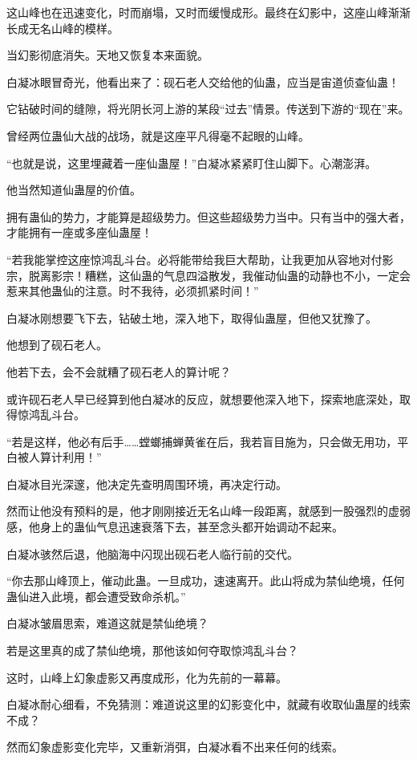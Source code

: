 \begin{this_body}
这山峰也在迅速变化，时而崩塌，又时而缓慢成形。最终在幻影中，这座山峰渐渐长成无名山峰的模样。

当幻影彻底消失。天地又恢复本来面貌。

白凝冰眼冒奇光，他看出来了：砚石老人交给他的仙蛊，应当是宙道侦查仙蛊！

它钻破时间的缝隙，将光阴长河上游的某段“过去”情景。传送到下游的“现在”来。

曾经两位蛊仙大战的战场，就是这座平凡得毫不起眼的山峰。

“也就是说，这里埋藏着一座仙蛊屋！”白凝冰紧紧盯住山脚下。心潮澎湃。

他当然知道仙蛊屋的价值。

拥有蛊仙的势力，才能算是超级势力。但这些超级势力当中。只有当中的强大者，才能拥有一座或多座仙蛊屋！

“若我能掌控这座惊鸿乱斗台。必将能带给我巨大帮助，让我更加从容地对付影宗，脱离影宗！糟糕，这仙蛊的气息四溢散发，我催动仙蛊的动静也不小，一定会惹来其他蛊仙的注意。时不我待，必须抓紧时间！”

白凝冰刚想要飞下去，钻破土地，深入地下，取得仙蛊屋，但他又犹豫了。

他想到了砚石老人。

他若下去，会不会就糟了砚石老人的算计呢？

或许砚石老人早已经算到他白凝冰的反应，就想要他深入地下，探索地底深处，取得惊鸿乱斗台。

“若是这样，他必有后手……螳螂捕蝉黄雀在后，我若盲目施为，只会做无用功，平白被人算计利用！”

白凝冰目光深邃，他决定先查明周围环境，再决定行动。

然而让他没有预料的是，他才刚刚接近无名山峰一段距离，就感到一股强烈的虚弱感，他身上的蛊仙气息迅速衰落下去，甚至念头都开始调动不起来。

白凝冰骇然后退，他脑海中闪现出砚石老人临行前的交代。

“你去那山峰顶上，催动此蛊。一旦成功，速速离开。此山将成为禁仙绝境，任何蛊仙进入此境，都会遭受致命杀机。”

白凝冰皱眉思索，难道这就是禁仙绝境？

若是这里真的成了禁仙绝境，那他该如何夺取惊鸿乱斗台？

这时，山峰上幻象虚影又再度成形，化为先前的一幕幕。

白凝冰耐心细看，不免猜测：难道说这里的幻影变化中，就藏有收取仙蛊屋的线索不成？

然而幻象虚影变化完毕，又重新消弭，白凝冰看不出来任何的线索。


\end{this_body}
